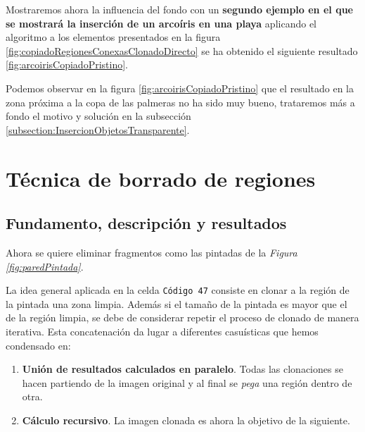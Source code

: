 \documentclass[11pt,twoside,titlepage,a4paper]{article}
\numberwithin{equation}{section} %
\theoremstyle{usual}
\begin{document}
Mostraremos ahora la influencia del fondo con un \textbf{segundo ejemplo en el que se mostrará la inserción de un arcoíris en una playa} aplicando el algoritmo a los elementos presentados en la figura  \ref{fig:copiadoRegionesConexasClonadoDirecto} se ha obtenido el siguiente resultado \ref{fig:arcoirisCopiadoPristino}.


Podemos observar en la figura \ref{fig:arcoirisCopiadoPristino} que el resultado en la zona próxima a la copa de las palmeras no ha sido muy bueno, trataremos más a fondo el motivo y solución en la subsección \ref{subsection:InsercionObjetosTransparente}. 




\newpage

\section{Técnica de borrado de regiones}

\subsection{Fundamento, descripción y resultados}

Ahora se quiere eliminar fragmentos como las pintadas de la \textit{Figura \ref{fig:paredPintada}}.

La idea general aplicada en la celda \texttt{Código 47} consiste en clonar a la región de la pintada una zona limpia.  Además si el tamaño de la pintada es mayor que el de la región limpia, se debe de considerar repetir el proceso de clonado de manera iterativa. Esta concatenación da lugar a diferentes casuísticas  que hemos condensado en: 

\begin{enumerate}
    \item \textbf{Unión de resultados calculados en paralelo}. Todas las clonaciones se hacen partiendo de la imagen original y al final se \textit{pega} una región dentro de otra. 
    \item \textbf{Cálculo recursivo}. La imagen clonada es ahora la objetivo de la siguiente. 
\end{enumerate}
\end{document}
